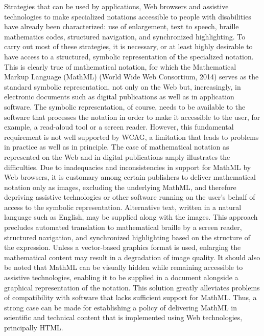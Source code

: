 \documentclass{sig-alternate} %
\begin{document}
\begin{large}
Strategies that can be used by applications, Web browsers and assistive technologies to make specialized notations accessible to people with disabilities have already been characterized: use of enlargement, text to speech, braille mathematics codes, structured navigation, and synchronized highlighting. To carry out most of these strategies, it is necessary, or at least highly desirable to have access to a structured, symbolic representation of the specialized notation. This is clearly true of mathematical notation, for which the Mathematical Markup Language (Math\-ML) (World Wide Web Consortium, 2014) serves as the standard symbolic representation, not only on the Web but, increasingly, in electronic documents such as digital publications as well as in application software. The symbolic representation, of course, needs to be available to the software that processes the notation in order to make it accessible to the user, for example, a read-aloud tool or a screen reader. However, this fundamental requirement is not well supported by WCAG, a limitation that leads to problems in practice as well as in principle. The case of mathematical notation as represented on the Web and in digital publications amply illustrates the difficulties. Due to inadequacies and inconsistencies in support for MathML by Web browsers, it is customary among certain publishers to deliver mathematical notation only as images, excluding the underlying MathML, and therefore depriving assistive technologies or other software running on the user’s behalf of access to the symbolic representation. Alternative text, written in a natural language such as English, may be supplied along with the images. This approach precludes automated translation to mathematical braille by a screen reader, structured navigation, and synchronized highlighting based on the structure of the expression. Unless a vector-based graphics format is used, enlarging the mathematical content may result in a degradation of image quality. It should also be noted that MathML can be visually hidden while remaining accessible to assistive technologies, enabling it to be supplied in a document alongside a graphical representation of the notation. This solution greatly alleviates problems of compatibility with software that lacks sufficient support for MathML. Thus, a strong case can be made for establishing a policy of delivering MathML in scientific and technical content that is implemented using Web technologies, principally HTML.


\end{large}
\end{document}
